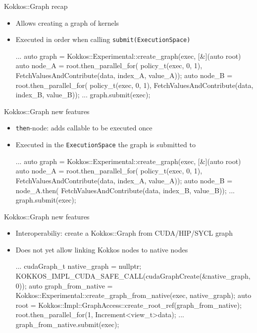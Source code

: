 \begin{frame}[fragile]{Kokkos::Graph recap}
 \begin{itemize}
     \item Allows creating a graph of kernels
     \item Executed in order when calling \texttt{submit(ExecutionSpace)}
      \begin{code}[keywords={auto}]
    ...
    auto graph = Kokkos::Experimental::create_graph(exec, [&](auto root) {
      auto node_A = root.then_parallel_for(
                    policy_t(exec, 0, 1),
                    FetchValuesAndContribute(data, index_A, value_A));
      auto node_B = root.then_parallel_for(
                    policy_t(exec, 0, 1),
                    FetchValuesAndContribute(data, index_B, value_B));}
    ...
    graph.submit(exec);
     \end{code}
 \end{itemize}
\end{frame}

\begin{frame}[fragile]{Kokkos::Graph new features}
 \begin{itemize}
   \item \texttt{then}-node: adds callable to be executed once
   \item Executed in the \texttt{ExecutionSpace} the graph is submitted to
     \begin{code}[keywords={auto}]
    ...
    auto graph = Kokkos::Experimental::create_graph(exec, [&](auto root) {
      auto node_A = root.then_parallel_for(
                    policy_t(exec, 0, 1),
                    FetchValuesAndContribute(data, index_A, value_A));
      auto node_B = node_A.then(
                    FetchValuesAndContribute(data, index_B, value_B));}
    ...
    graph.submit(exec);
     \end{code}
 \end{itemize}
\end{frame}

\begin{frame}[fragile]{Kokkos::Graph new features}
 \begin{itemize}
   \item Interoperabiliy: create a Kokkos::Graph from CUDA/HIP/SYCL graph
   \item Does not yet allow linking Kokkos nodes to native nodes
     \begin{code}[keywords={auto}]
    ...
    cudaGraph_t native_graph = nullptr;
    KOKKOS_IMPL_CUDA_SAFE_CALL(cudaGraphCreate(&native_graph, 0));
    auto graph_from_native =
      Kokkos::Experimental::create_graph_from_native(exec, native_graph);
    auto root = Kokkos::Impl::GraphAccess::create_root_ref(graph_from_native);
    root.then_parallel_for(1, Increment<view_t>{data});
    ...
    graph_from_native.submit(exec);
     \end{code}
 \end{itemize}
\end{frame}

